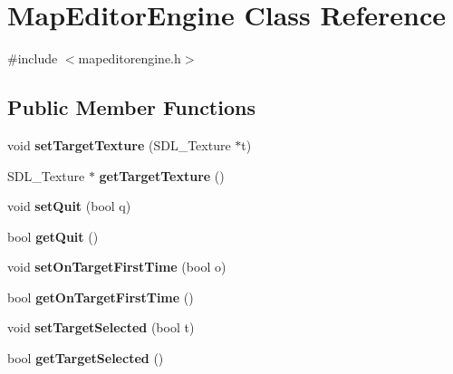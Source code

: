 \hypertarget{class_map_editor_engine}{}\section{Map\+Editor\+Engine Class Reference}
\label{class_map_editor_engine}


{\ttfamily \#include $<$mapeditorengine.\+h$>$}

\subsection*{Public Member Functions}
\begin{DoxyCompactItemize}
\item 
\hypertarget{class_map_editor_engine_a32c6fb2593a2248e66c857688c1cedca}{}\label{class_map_editor_engine_a32c6fb2593a2248e66c857688c1cedca} 
void {\bfseries set\+Target\+Texture} (S\+D\+L\+\_\+\+Texture $\ast$t)
\item 
\hypertarget{class_map_editor_engine_a72a249d670255c5142588676bff7716f}{}\label{class_map_editor_engine_a72a249d670255c5142588676bff7716f} 
S\+D\+L\+\_\+\+Texture $\ast$ {\bfseries get\+Target\+Texture} ()
\item 
\hypertarget{class_map_editor_engine_a7758d0efaf3109d2443649ab322122a8}{}\label{class_map_editor_engine_a7758d0efaf3109d2443649ab322122a8} 
void {\bfseries set\+Quit} (bool q)
\item 
\hypertarget{class_map_editor_engine_a8ca99beca7e8a31fbb2283c3880b0da8}{}\label{class_map_editor_engine_a8ca99beca7e8a31fbb2283c3880b0da8} 
bool {\bfseries get\+Quit} ()
\item 
\hypertarget{class_map_editor_engine_abbb6461f5fd2aed11fb08db76f3540fb}{}\label{class_map_editor_engine_abbb6461f5fd2aed11fb08db76f3540fb} 
void {\bfseries set\+On\+Target\+First\+Time} (bool o)
\item 
\hypertarget{class_map_editor_engine_a9bd505861525f0a7e5c20027dd5c7398}{}\label{class_map_editor_engine_a9bd505861525f0a7e5c20027dd5c7398} 
bool {\bfseries get\+On\+Target\+First\+Time} ()
\item 
\hypertarget{class_map_editor_engine_adffe78c289a8791492f5ee086d6a084b}{}\label{class_map_editor_engine_adffe78c289a8791492f5ee086d6a084b} 
void {\bfseries set\+Target\+Selected} (bool t)
\item 
\hypertarget{class_map_editor_engine_afd21a270aa1533aeb287d3992c0e2286}{}\label{class_map_editor_engine_afd21a270aa1533aeb287d3992c0e2286} 
bool {\bfseries get\+Target\+Selected} ()

\end{DoxyCompactItemize}
